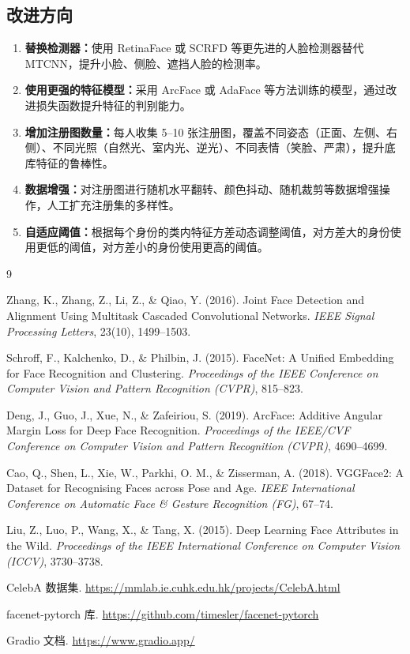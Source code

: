 \documentclass[12pt, a4paper]{article}
\begin{document}
\subsection{改进方向}

\begin{enumerate}
  \item \textbf{替换检测器：}使用 RetinaFace 或 SCRFD 等更先进的人脸检测器替代 MTCNN，提升小脸、侧脸、遮挡人脸的检测率。
  \item \textbf{使用更强的特征模型：}采用 ArcFace\cite{deng2019arcface} 或 AdaFace 等方法训练的模型，通过改进损失函数提升特征的判别能力。
  \item \textbf{增加注册图数量：}每人收集 5--10 张注册图，覆盖不同姿态（正面、左侧、右侧）、不同光照（自然光、室内光、逆光）、不同表情（笑脸、严肃），提升底库特征的鲁棒性。
  \item \textbf{数据增强：}对注册图进行随机水平翻转、颜色抖动、随机裁剪等数据增强操作，人工扩充注册集的多样性。
  \item \textbf{自适应阈值：}根据每个身份的类内特征方差动态调整阈值，对方差大的身份使用更低的阈值，对方差小的身份使用更高的阈值。
\end{enumerate}


\newpage
\begin{thebibliography}{9}

Zhang, K., Zhang, Z., Li, Z., \& Qiao, Y. (2016).
Joint Face Detection and Alignment Using Multitask Cascaded Convolutional Networks.
\textit{IEEE Signal Processing Letters}, 23(10), 1499--1503.

Schroff, F., Kalchenko, D., \& Philbin, J. (2015).
FaceNet: A Unified Embedding for Face Recognition and Clustering.
\textit{Proceedings of the IEEE Conference on Computer Vision and Pattern Recognition (CVPR)}, 815--823.

Deng, J., Guo, J., Xue, N., \& Zafeiriou, S. (2019).
ArcFace: Additive Angular Margin Loss for Deep Face Recognition.
\textit{Proceedings of the IEEE/CVF Conference on Computer Vision and Pattern Recognition (CVPR)}, 4690--4699.

Cao, Q., Shen, L., Xie, W., Parkhi, O. M., \& Zisserman, A. (2018).
VGGFace2: A Dataset for Recognising Faces across Pose and Age.
\textit{IEEE International Conference on Automatic Face \& Gesture Recognition (FG)}, 67--74.

Liu, Z., Luo, P., Wang, X., \& Tang, X. (2015).
Deep Learning Face Attributes in the Wild.
\textit{Proceedings of the IEEE International Conference on Computer Vision (ICCV)}, 3730--3738.

CelebA 数据集. \url{https://mmlab.ie.cuhk.edu.hk/projects/CelebA.html}

facenet-pytorch 库. \url{https://github.com/timesler/facenet-pytorch}

Gradio 文档. \url{https://www.gradio.app/}

\end{thebibliography}
\end{document}
